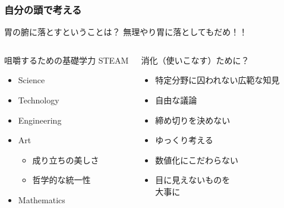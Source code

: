\documentclass[12pt, dvipdfmx]{beamer}
\begin{document}
\begin{frame}
    \frametitle{自分の頭で考える}
        \begin{alertblock}{胃の腑に落とすということは？}
            無理やり胃に落としてもだめ！！

            \begin{columns}[T, onlytextwidth]
                
                \begin{block}{咀嚼するための基礎学力}
                    STEAM 
                    \begin{itemize}
                        \item Science
                        \item Technology
                        \item Engineering
                        \item \alert{Art}
                        \begin{itemize}
                            \item 成り立ちの美しさ
                            \item 哲学的な統一性 
                        \end{itemize}
                        \item Mathematics
                    \end{itemize}
                \end{block}
                \begin{exampleblock}{消化（使いこなす）ために？}
                    \begin{itemize}
                        \item 特定分野に囚われない広範な知見
                        \item 自由な議論
                        \item 締め切りを決めない
                        \item ゆっくり考える
                        \item 数値化にこだわらない
                        \item 目に見えないものを\\大事に
                    \end{itemize}
                \end{exampleblock}
            \end{columns}
        \end{alertblock}
\end{frame}
\end{document}
